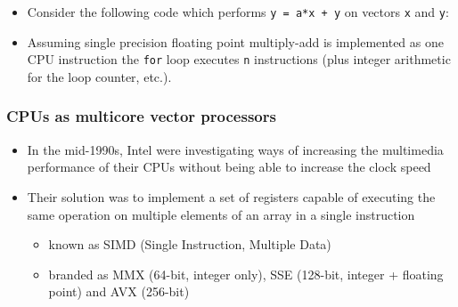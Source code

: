 \begin{itemize}
\itemsep1pt\parskip0pt
\item
  Consider the following code which performs \texttt{y = a*x + y} on
  vectors \texttt{x} and \texttt{y}:
\end{itemize}

\begin{Shaded}
\begin{Highlighting}[]

      
            
     \NormalTok{)}
         \NormalTok{;}

     \NormalTok{(} 

     \NormalTok{;}
\NormalTok{\}}
\end{Highlighting}
\end{Shaded}

\begin{itemize}
\itemsep1pt\parskip0pt
\item
  Assuming single precision floating point multiply-add is implemented
  as one CPU instruction the \texttt{for} loop executes \texttt{n}
  instructions (plus integer arithmetic for the loop counter, etc.).
\end{itemize}

\subsubsection{CPUs as multicore vector
processors}\label{cpus-as-multicore-vector-processors}

\begin{itemize}
\itemsep1pt\parskip0pt
\item
  In the mid-1990s, Intel were investigating ways of increasing the
  multimedia performance of their CPUs without being able to increase
  the clock speed
\item
  Their solution was to implement a set of registers capable of
  executing the same operation on multiple elements of an array in a
  single instruction

  \begin{itemize}
  \itemsep1pt\parskip0pt
  \item
    known as SIMD (Single Instruction, Multiple Data)
  \item
    branded as MMX (64-bit, integer only), SSE (128-bit, integer +
    floating point) and AVX (256-bit)
  \end{itemize}
\end{itemize}

